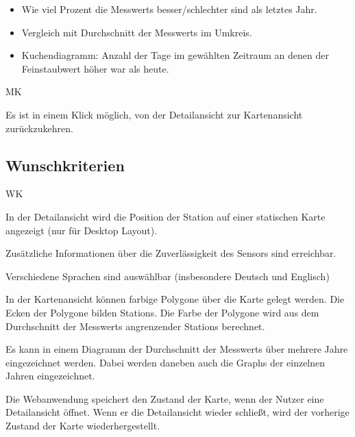 \begin{itemize}
	\item Wie viel Prozent die \glspl{Messwert} besser/schlechter sind als letztes Jahr.
    \item Vergleich mit Durchschnitt der \glspl{Messwert} im Umkreis.
    \item \gls{Kuchendiagramm}: Anzahl der Tage im gewählten Zeitraum an denen der Feinstaubwert höher war als heute.
\end{itemize}

\begin{Kriterien}{MK}	

	\item Es ist in einem Klick möglich, von der \gls{Detailansicht} zur \gls{Kartenansicht} zurückzukehren.

\end{Kriterien}

\newpage
\subsection{Wunschkriterien}
\setcounter{counter}{10}
\begin{Kriterien}{WK}

	\item In der \gls{Detailansicht} wird die Position der \gls{Station} auf einer statischen Karte angezeigt (nur für Desktop 
	Layout). 

	\item Zusätzliche Informationen über die Zuverlässigkeit des Sensors sind erreichbar.

	\item Verschiedene Sprachen sind auswählbar (insbesondere Deutsch und Englisch)
	
	\item In der \gls{Kartenansicht} können farbige Polygone über die Karte gelegt werden. Die Ecken der Polygone bilden \glspl{Station}. Die Farbe der Polygone wird aus dem Durchschnitt der \glspl{Messwert} angrenzender \glspl{Station} berechnet.
	
	\item Es kann in einem Diagramm der Durchschnitt der \glspl{Messwert} über mehrere Jahre eingezeichnet werden. Dabei werden daneben auch die \glspl{Graph} der einzelnen Jahren eingezeichnet.
	
	\item Die Webanwendung speichert den Zustand der Karte, wenn der Nutzer eine \gls{Detailansicht} öffnet. Wenn er die \gls{Detailansicht} wieder schließt, wird der vorherige Zustand der Karte wiederhergestellt.

\end{Kriterien}


